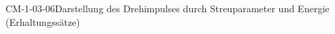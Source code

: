 
\begin{PROP}{CM-1-03-06}{Darstellung des Drehimpulses durch Streuparameter und Energie (Erhaltungssätze)}
\end{PROP}
